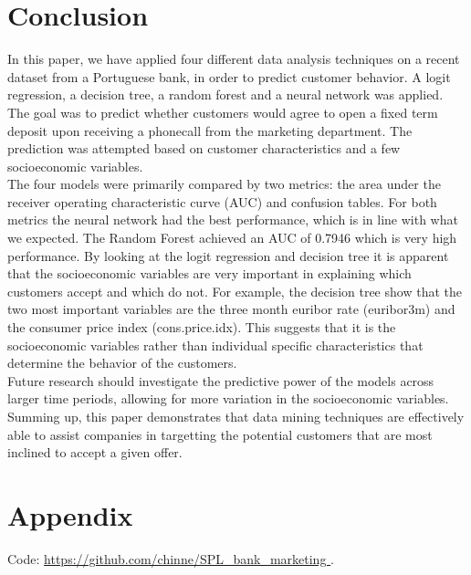  \section{Conclusion}
 \noindent In this paper, we have applied four different data analysis techniques on a recent dataset from a Portuguese bank, in order to predict customer behavior. A logit regression, a decision tree, a random forest and a neural network was applied. The goal was to predict whether customers would agree to open a fixed term deposit upon receiving a phonecall from the marketing department. The prediction was attempted based on customer characteristics and a few socioeconomic variables.\\
 	[\baselineskip]\indent The four models were primarily compared by two metrics: the area under the receiver operating characteristic curve (AUC) and confusion tables. For both metrics the neural network had the best performance, which is in line with what we expected. The Random Forest achieved an AUC of 0.7946 which is very high performance. By looking at the logit regression and decision tree it is apparent that the socioeconomic variables are very important in explaining which customers accept and which do not. For example, the decision tree show that the two most important variables are the three month euribor rate (euribor3m) and the consumer price index (cons.price.idx). This suggests that it is the socioeconomic variables rather than individual specific characteristics that determine the behavior of the customers.\\
 [\baselineskip]\indent Future research should investigate the predictive power of the models across larger time periods, allowing for more variation in the socioeconomic variables.\\
[\baselineskip]\indent Summing up, this paper demonstrates that data mining techniques are effectively able to assist companies in targetting the potential customers that are most inclined to accept a given offer. 
 \newpage
\pagestyle{fancy}



\newpage
\pagestyle{fancy}
    \section*{Appendix}
 \noindent Code:  \url{https://github.com/chinne/SPL_bank_marketing 
}.\\

 


